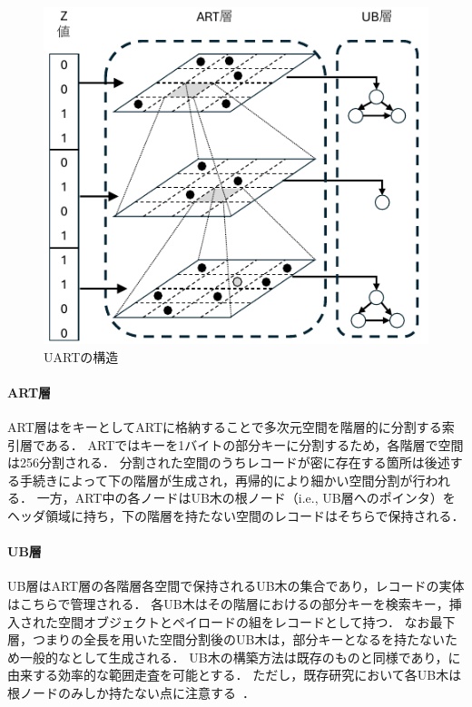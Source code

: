 \begin{figure}[tb]
  \centering
  \includegraphics[scale = 1.75]{./figures/fig_uart.pdf}
  \caption{UARTの構造}
  \label{fig:uart}
\end{figure}

\paragraph{ART層}

ART層は\ZValue をキーとしてARTに格納することで多次元空間を階層的に分割する索引層である．
ARTではキーを1バイトの部分キーに分割するため，各階層で空間は256分割される．
分割された空間のうちレコードが密に存在する箇所は後述する手続きによって下の階層が生成され，再帰的により細かい空間分割が行われる．
一方，ART中の各ノードはUB木の根ノード（i.e., UB層へのポインタ）をヘッダ領域に持ち，下の階層を持たない空間のレコードはそちらで保持される．

\paragraph{UB層}

UB層はART層の各階層各空間で保持されるUB木の集合であり，レコードの実体はこちらで管理される．
各UB木はその階層における\ZValue の部分キーを検索キー，挿入された空間オブジェクトとペイロードの組をレコードとして持つ．
なお最下層，つまり\ZValue の全長を用いた空間分割後のUB木は，部分キーとなる\ZValue を持たないため一般的な\BTree として生成される．
UB木の構築方法は既存のものと同様であり，\BTree に由来する効率的な範囲走査を可能とする．
ただし，既存研究において各UB木は根ノードのみしか持たない点に注意する~\cite{deim:Suzuki2023}．





